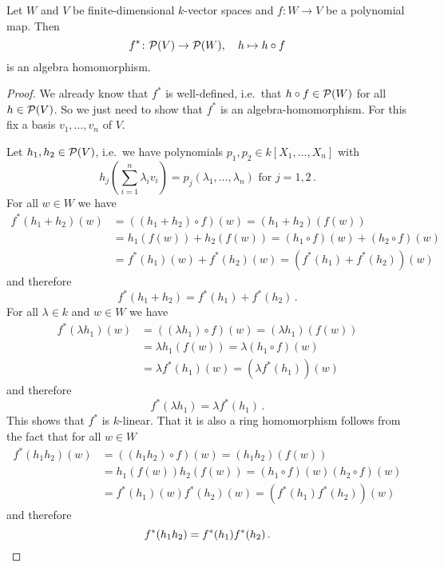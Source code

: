 \begin{lemma}
  Let $W$ and $V$ be finite-dimensional $k$-vector spaces and $f \colon W \to V$ be a polynomial map. Then
  \[
            f^*
    \colon  \mathcal{P}(V)
    \to     \mathcal{P}(W),
    \quad   h
    \mapsto h \circ f
  \]
  is an algebra homomorphism.
\end{lemma}
\begin{proof}
  We already know that $f^*$ is well-defined, i.e.\ that $h \circ f \in \mathcal{P}(W)$ for all $h \in \mathcal{P}(V)$.
  So we just need to show that $f^*$ is an algebra-homomorphism.
  For this fix a basis $v_1, \dotsc, v_n$ of $V$.
  
  Let $h_1, h_2\in \mathcal{P}(V)$, i.e.\ we have polynomials $p_1, p_2\in k[X_1, \dotsc, X_n]$ with
  \[
      h_j\left( \sum_{i=1}^n \lambda_i v_i \right)
    = p_j(\lambda_1, \dotsc, \lambda_n)
    \text{ for }
    j = 1, 2 \,.
  \]
  For all $w \in W$ we have
  \begin{align*}
        f^*(h_1+h_2)(w)
    &=  ((h_1 + h_2) \circ f)(w)
     =  (h_1 + h_2)(f(w)) \\
    &=  h_1(f(w)) + h_2(f(w))
     =  (h_1 \circ f)(w) + (h_2 \circ f)(w) \\
    &=  f^*(h_1)(w) + f^*(h_2)(w)
     =  (f^*(h_1)+f^*(h_2))(w)
  \end{align*}
  and therefore
  \[
      f^*(h_1 + h_2)
    = f^*(h_1) + f^*(h_2) \,.
  \]
  For all $\lambda \in k$ and $w \in W$ we have
  \begin{align*}
        f^*(\lambda h_1)(w)
    &=  ((\lambda h_1) \circ f)(w)
     =  (\lambda h_1)(f(w)) \\
    &=  \lambda h_1(f(w))
     =  \lambda (h_1 \circ f)(w) \\
    &=  \lambda f^*(h_1)(w)
     =  (\lambda f^*(h_1))(w)
  \end{align*}
  and therefore
  \[
      f^*(\lambda h_1)
    = \lambda f^*(h_1) \,.
  \]
  This shows that $f^*$ is $k$-linear. That it is also a ring homomorphism follows from the fact that for all $w \in W$
  \begin{align*}
        f^*(h_1 h_2)(w)
    &=  ((h_1 h_2) \circ f)(w)
     =  (h_1 h_2)(f(w)) \\
    &=  h_1(f(w)) h_2(f(w))
     =  (h_1 \circ f)(w) (h_2 \circ f)(w) \\
    &=  f^*(h_1)(w) f^*(h_2)(w)
     =  (f^*(h_1) f^*(h_2))(w)
  \end{align*}
  and therefore
  \[
      f^*(h_1 h_2)
    = f^*(h_1) f^*(h_2) \,.
    \qedhere
  \]
\end{proof}


